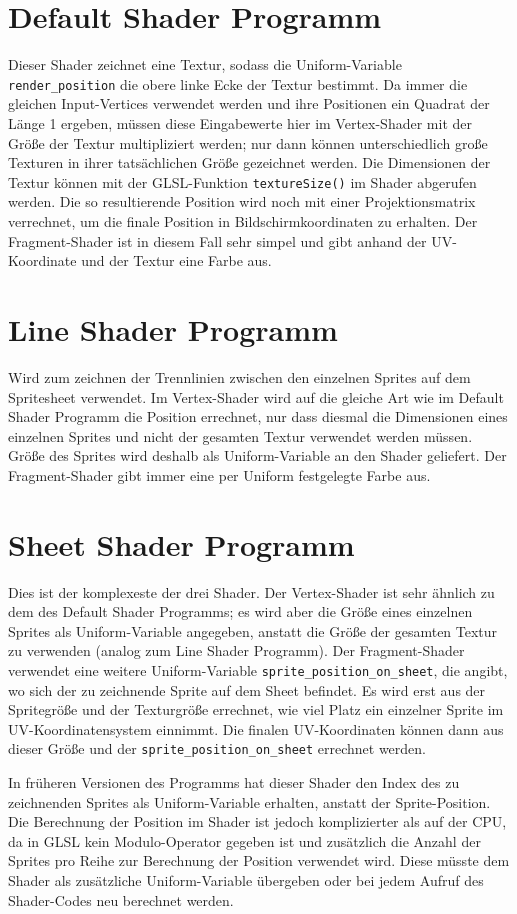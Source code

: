 \section{Default Shader Programm}
Dieser Shader zeichnet eine Textur, sodass die Uniform-Variable \lstinline{render_position} die obere linke Ecke der Textur bestimmt. Da immer die gleichen Input-Vertices verwendet werden und ihre Positionen ein Quadrat der Länge 1 ergeben, müssen diese Eingabewerte hier im Vertex-Shader mit der Größe der Textur multipliziert werden; nur dann können unterschiedlich große Texturen in ihrer tatsächlichen Größe gezeichnet werden. Die Dimensionen der Textur können mit der GLSL-Funktion \lstinline{textureSize()} im Shader abgerufen werden. Die so resultierende Position wird noch mit einer Projektionsmatrix verrechnet, um die finale Position in Bildschirmkoordinaten zu erhalten. Der Fragment-Shader ist in diesem Fall sehr simpel und gibt anhand der UV-Koordinate und der Textur eine Farbe aus.

\section{Line Shader Programm}
Wird zum zeichnen der Trennlinien zwischen den einzelnen Sprites auf dem Spritesheet verwendet. Im Vertex-Shader wird auf die gleiche Art wie im Default Shader Programm die Position errechnet, nur dass diesmal die Dimensionen eines einzelnen Sprites und nicht der gesamten Textur verwendet werden müssen. Größe des Sprites wird deshalb als Uniform-Variable an den Shader geliefert. Der Fragment-Shader gibt immer eine per Uniform festgelegte Farbe aus.

\section{Sheet Shader Programm}
Dies ist der komplexeste der drei Shader. Der Vertex-Shader ist sehr ähnlich zu dem des Default Shader Programms; es wird aber die Größe eines einzelnen Sprites als Uniform-Variable angegeben, anstatt die Größe der gesamten Textur zu verwenden (analog zum Line Shader Programm). Der Fragment-Shader verwendet eine weitere Uniform-Variable \lstinline{sprite_position_on_sheet}, die angibt, wo sich der zu zeichnende Sprite auf dem Sheet befindet. Es wird erst aus der Spritegröße und der Texturgröße errechnet, wie viel Platz ein einzelner Sprite im UV-Koordinatensystem einnimmt. Die finalen UV-Koordinaten können dann aus dieser Größe und der \lstinline{sprite_position_on_sheet} errechnet werden. 

In früheren Versionen des Programms hat dieser Shader den Index des zu zeichnenden Sprites als Uniform-Variable erhalten, anstatt der Sprite-Position. Die Berechnung der Position im Shader ist jedoch komplizierter als auf der CPU, da in GLSL kein Modulo-Operator gegeben ist und zusätzlich die Anzahl der Sprites pro Reihe zur Berechnung der Position verwendet wird. Diese müsste dem Shader als zusätzliche Uniform-Variable übergeben oder bei jedem Aufruf des Shader-Codes neu berechnet werden.